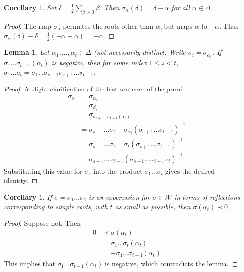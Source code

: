 \documentclass{article}
\newtheorem{lem}[thm]{Lemma}
\newtheorem{cor}[thm]{Corollary}
\begin{document}
\begin{cor} Set $\delta = \frac{1}{2} \sum_{\beta \succ 0} \beta$. Then $\sigma_\alpha(\delta) = \delta - \alpha$ for all $\alpha \in \Delta$.
\end{cor}
\begin{proof}
The map $\sigma_\alpha$ permutes the roots other than $\alpha$, but maps $\alpha$ to $-\alpha$.  
Thus $\sigma_\alpha(\delta) - \delta = \frac{1}{2} (-\alpha - \alpha) = -\alpha$.
\end{proof}

\begin{lem} Let $\alpha_1, \ldots, \alpha_t \in \Delta$ (not necessarily distinct. Write $\sigma_i = \sigma_{\alpha_i}$.
If $\sigma_1 \ldots \sigma_{t-1}(\alpha_t)$ is negative, then for some index 
$1 \le s < t$, $\sigma_1 \ldots \sigma_t = \sigma_1 \ldots \sigma_{s-1} \sigma_{s+1} \ldots
\sigma_{t-1}$.
\end{lem}
\begin{proof}
A slight clarification of the last sentence of the proof:
\begin{align*}
\sigma_s & = \sigma_{\alpha_s}
\\ & = \sigma_{\beta_s}
\\ & = \sigma_{\sigma_{s+1} \ldots \sigma_{t-1}(\alpha_t)}
\\ & = \sigma_{s+1} \ldots \sigma_{t-1} \sigma_{\alpha_t}   (\sigma_{s+1} \ldots \sigma_{t-1})^{-1}
\\ & = \sigma_{s+1} \ldots \sigma_{t-1} \sigma_t   (\sigma_{s+1} \ldots \sigma_{t-1})^{-1}
\\ & = \sigma_{s+1} \ldots \sigma_{t-1}  (\sigma_{s+1} \ldots \sigma_{t-1} \sigma_t)^{-1}
\end{align*}
Substituting this value for $\sigma_s$ into the product $\sigma_1 \ldots \sigma_t$ gives
the desired identity.
\end{proof}

\begin{cor} If $\sigma = \sigma_1 \ldots \sigma_2$ is an experession for $\sigma \in \mathcal W$ in terms of reflections corresponding to simple roots, with $t$ as small as possible, then $\sigma(\alpha_t) \prec 0$.
\end{cor}
\begin{proof}
Suppose not.  Then 
\begin{align*}
0 & \prec \sigma(\alpha_t) 
\\ &  = \sigma_1 \ldots \sigma_t (\alpha_t)
\\ &  = - \sigma_1 \ldots \sigma_{t-1} (\alpha_t)
\end{align*}
This implies that $\sigma_1 \ldots \sigma_{t-1} (\alpha_t)$ is negative, which contradicts the lemma.
\end{proof}
\end{document}
